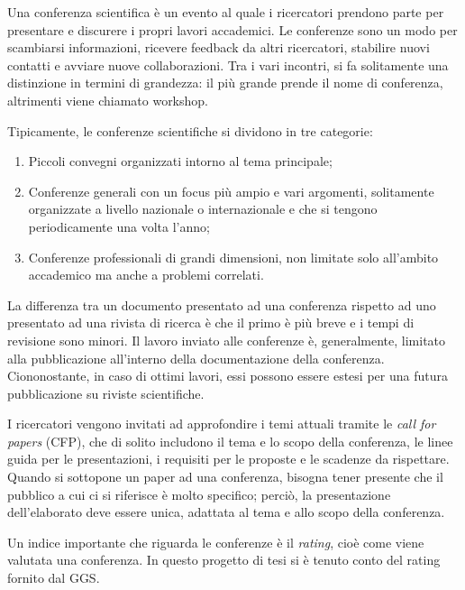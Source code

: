 Una conferenza scientifica è un evento al quale i ricercatori prendono parte per presentare e discurere i propri lavori accademici. Le conferenze sono un modo per scambiarsi informazioni, ricevere feedback da altri ricercatori, stabilire nuovi contatti e avviare nuove collaborazioni. 
Tra i vari incontri, si fa solitamente una distinzione in termini di grandezza: il più grande prende il nome di conferenza, altrimenti viene chiamato workshop.

Tipicamente, le conferenze scientifiche si dividono in tre categorie: 
\begin{enumerate}
    \item Piccoli convegni organizzati intorno al tema principale;
    \item Conferenze generali con un focus più ampio e vari argomenti, solitamente organizzate a livello nazionale o internazionale e che si tengono periodicamente una volta l'anno;
    \item Conferenze professionali di grandi dimensioni, non limitate solo all'ambito accademico ma anche a problemi correlati.
\end{enumerate}

La differenza tra un documento presentato ad una conferenza rispetto ad uno
presentato ad una rivista di ricerca è che il primo è più breve e i tempi
di revisione sono minori. Il lavoro inviato alle conferenze è, generalmente,
limitato alla pubblicazione all’interno della documentazione della conferenza.
Ciononostante, in caso di ottimi lavori, essi possono essere estesi per una
futura pubblicazione su riviste scientifiche.

I ricercatori vengono invitati ad approfondire i temi attuali tramite le
\textit{call for papers} (CFP), che di solito includono il tema e lo scopo della
conferenza, le linee guida per le presentazioni, i requisiti per le proposte
e le scadenze da rispettare. Quando si sottopone un paper ad una conferenza,
bisogna tener presente che il pubblico a cui ci si riferisce è molto specifico;
perciò, la presentazione dell’elaborato deve essere unica, adattata al tema e
allo scopo della conferenza.


Un indice importante che riguarda le conferenze è il \textit{rating}, cioè
come viene valutata una conferenza. In questo progetto di tesi si è tenuto
conto del rating fornito dal GGS.

